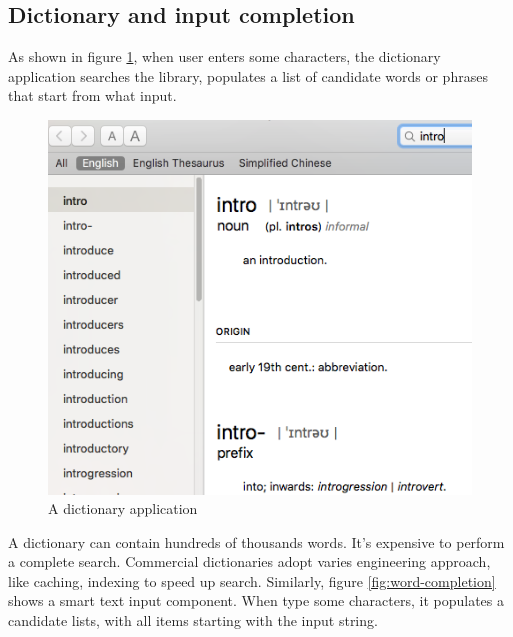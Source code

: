 \documentclass[b5paper]{article}
\begin{document}
\subsection{Dictionary and input completion}
As shown in figure \ref{fig:e-dict}, when user enters some characters, the dictionary application searches the library, populates a list of candidate words or phrases that start from what input.

\begin{figure}[htbp]
  \centering
  \includegraphics[scale=0.4]{img/edict-en}
  \caption{A dictionary application}
  \label{fig:e-dict}
\end{figure}

A dictionary can contain hundreds of thousands words. It's expensive to perform a complete search. Commercial dictionaries adopt varies engineering approach, like caching, indexing to speed up search. Similarly, figure \ref{fig:word-completion} shows a smart text input component. When type some characters, it populates a candidate lists, with all items starting with the input string.
\end{document}
